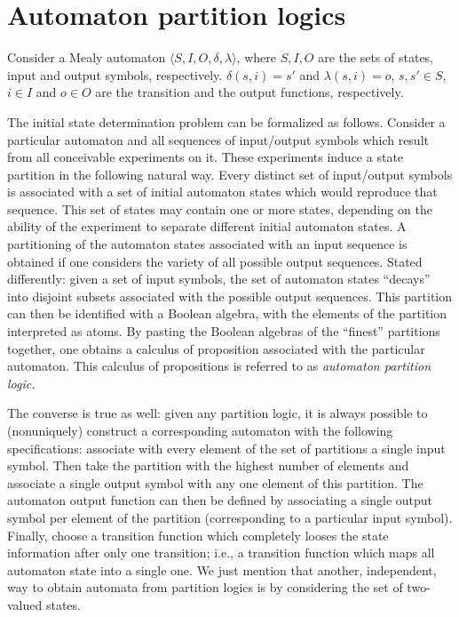 \section{Automaton partition logics}
Consider a Mealy automaton
$\langle S,I,O,\delta ,\lambda \rangle$, where
 $S,I,O$ are the sets of states,
input and output symbols, respectively.
$\delta (s,i)=s'$ and
$\lambda (s,i)=o$,
$s,s'\in S$,
$i\in I$
and $o\in O$
are the transition and the output functions, respectively.


The initial state determination problem can be formalized as follows.
Consider a particular automaton
and all sequences of input/output symbols which result from
all conceivable experiments on it.
These experiments induce a state partition in the following natural way.
Every distinct set of input/output symbols is associated with a set of initial automaton
states which would reproduce that sequence.
This set of states may contain one or more states, depending on the ability of the experiment
to separate different initial automaton states.
A partitioning of the automaton states associated with an input sequence
is obtained if one considers the variety of all possible output sequences.
Stated differently:
given a set of input symbols, the set of automaton states ``decays'' into disjoint
subsets associated with the possible output sequences.
This partition can then be identified with a Boolean algebra,
with the elements of the partition interpreted as atoms.
By pasting the Boolean algebras of the ``finest'' partitions together, one obtains
a calculus of proposition associated with the particular automaton.
This calculus of propositions is referred to as {\em automaton partition logic.}

The converse is true as well:
given any partition logic, it is always possible to (nonuniquely)
construct a corresponding automaton with the following specifications:
associate with every element of the set of partitions a single input symbol.
Then take the partition with the highest number of elements and associate a single output
symbol with any one element of this partition.
The automaton output function  can then be defined by associating a single output symbol per element
of the partition (corresponding to a particular input symbol).
Finally, choose a transition function which completely looses the state information
after only one transition; i.e., a transition function which maps all automaton state into
a single one.
We just mention that another, independent, way to obtain automata from partition logics
is by considering the set of two-valued states.

